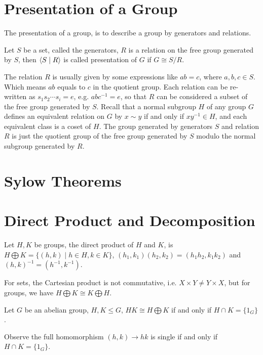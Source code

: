 
\section{Presentation of a Group}
The presentation of a group, is to describe a group by generators and relations.
\begin{defi}[presentation]
Let $S$ be a set, called the generators,
$R$ is a relation on the free group generated by $S$,
then $\left< {S \mid R} \right>$ is called presentation of $G$ if $G \cong S / R$.
\end{defi}
The relation $R$ is usually given by some expressions like $ab = c$, where $a, b, c \in S$.
Which means $ab$ equals to $c$ in the quotient group.
Each relation can be re-written as $s_1s_2 \cdots s_i = e$, e.g. $abc^{-1} = e$, 
so that $R$ can be considered a subset of the free group generated by $S$.
Recall that a normal subgroup $H$ of any 
group $G$ defines an equivalent relation on $G$ by $x \sim y$ if and only if $xy^{-1} \in H$,
and each equivalent class is a coset of $H$. The group generated by generators $S$ and relation 
$R$ is just the quotient group of the free group generated by $S$ modulo the normal subgroup 
generated by $R$.


\section{Sylow Theorems}
\begin{thm}
\end{thm}

\section{Direct Product and Decomposition}
\begin{defi}
Let $H, K$ be groups, the direct product of $H$ and $K$, is $H \bigoplus K = \{(h, k) \mid h \in H, k \in K\}$,
$(h_1, k_1)(h_2, k_2) = (h_1h_2, k_1k_2)$ and $(h, k)^{-1} = (h^{-1}, k^{-1})$.
\end{defi}
For sets, the Cartesian product is not commutative, i.e. $X \times Y \neq Y \times X$,
but for groups, we have $H \bigoplus K \cong K \bigoplus H$.
\begin{thm}
Let $G$ be an abelian group, $H, K \leq G$, $HK \cong H \bigoplus K$ if and only if $H \cap K = \{1_G\}$.
\end{thm}
\begin{prf}
Observe the full homomorphism $(h, k) \to hk$ is single if and only if $H \cap K = \{1_G\}$.
\end{prf}

